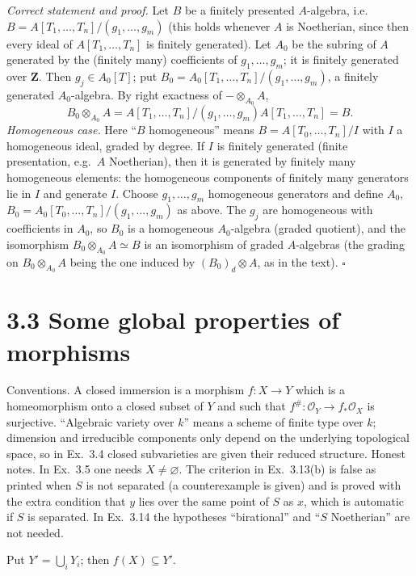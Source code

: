 \documentclass[11pt]{article}
\begin{document}
\emph{Correct statement and proof.} Let $B$ be a finitely presented $A$-algebra, i.e.\ $B=A[T_1,\dots,T_n]/(g_1,\dots,g_m)$ (this holds whenever $A$ is Noetherian, since then every ideal of $A[T_1,\dots,T_n]$ is finitely generated). Let $A_0$ be the subring of $A$ generated by the (finitely many) coefficients of $g_1,\dots,g_m$; it is finitely generated over $\mathbf Z$. Then $g_j\in A_0[T]$; put $B_0=A_0[T_1,\dots,T_n]/(g_1,\dots,g_m)$, a finitely generated $A_0$-algebra. By right exactness of $-\otimes_{A_0}A$,
\[ B_0\otimes_{A_0}A=A[T_1,\dots,T_n]/(g_1,\dots,g_m)A[T_1,\dots,T_n]=B. \]
\emph{Homogeneous case.} Here ``$B$ homogeneous'' means $B=A[T_0,\dots,T_n]/I$ with $I$ a homogeneous ideal, graded by degree. If $I$ is finitely generated (finite presentation, e.g.\ $A$ Noetherian), then it is generated by finitely many homogeneous elements: the homogeneous components of finitely many generators lie in $I$ and generate $I$. Choose $g_1,\dots,g_m$ homogeneous generators and define $A_0$, $B_0=A_0[T_0,\dots,T_n]/(g_1,\dots,g_m)$ as above. The $g_j$ are homogeneous with coefficients in $A_0$, so $B_0$ is a homogeneous $A_0$-algebra (graded quotient), and the isomorphism $B_0\otimes_{A_0}A\simeq B$ is an isomorphism of graded $A$-algebras (the grading on $B_0\otimes_{A_0}A$ being the one induced by $(B_0)_d\otimes A$, as in the text). \hfill$\square$

\section*{3.3 Some global properties of morphisms}

Conventions. A closed immersion is a morphism $f:X\to Y$ which is a homeomorphism onto a closed subset of $Y$ and such that $f^\#:\mathcal O_Y\to f_*\mathcal O_X$ is surjective. ``Algebraic variety over $k$'' means a scheme of finite type over $k$; dimension and irreducible components only depend on the underlying topological space, so in Ex.~3.4 closed subvarieties are given their reduced structure. Honest notes. In Ex.~3.5 one needs $X\neq\varnothing$. The criterion in Ex.~3.13(b) is false as printed when $S$ is not separated (a counterexample is given) and is proved with the extra condition that $y$ lies over the same point of $S$ as $x$, which is automatic if $S$ is separated. In Ex.~3.14 the hypotheses ``birational'' and ``$S$ Noetherian'' are not needed.

\pf
Put $Y'=\bigcup_iY_i$; then $f(X)\subseteq Y'$.
\end{document}
